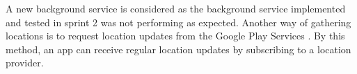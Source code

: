 A new background service is considered as the background service implemented and tested in sprint 2 was not performing as expected.
Another way of gathering locations is to request location updates from the Google Play Services \cite{receivingLocationUpdates}.
By this method, an app can receive regular location updates by subscribing to a location provider.
